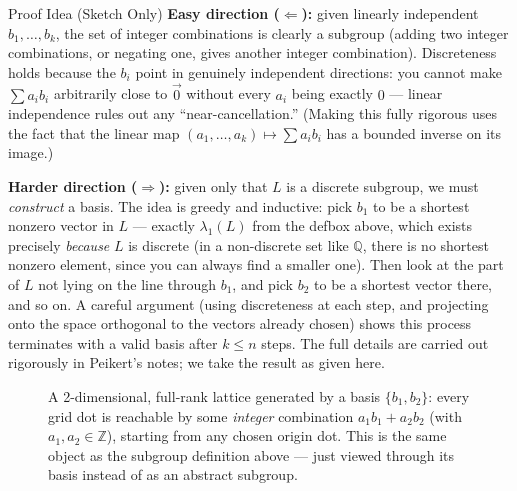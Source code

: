 \begin{rmkbox}{Proof Idea (Sketch Only)}
\textbf{Easy direction ($\Leftarrow$):} given linearly independent $b_1,\ldots,b_k$, the set of integer combinations is clearly a subgroup (adding two integer combinations, or negating one, gives another integer combination). Discreteness holds because the $b_i$ point in genuinely independent directions: you cannot make $\sum a_i b_i$ arbitrarily close to $\vec 0$ without every $a_i$ being exactly $0$ --- linear independence rules out any ``near-cancellation.'' (Making this fully rigorous uses the fact that the linear map $(a_1,\ldots,a_k) \mapsto \sum a_i b_i$ has a bounded inverse on its image.)

\textbf{Harder direction ($\Rightarrow$):} given only that $L$ is a discrete subgroup, we must \emph{construct} a basis. The idea is greedy and inductive: pick $b_1$ to be a shortest nonzero vector in $L$ --- exactly $\lambda_1(L)$ from the defbox above, which exists precisely \emph{because} $L$ is discrete (in a non-discrete set like $\mathbb{Q}$, there is no shortest nonzero element, since you can always find a smaller one). Then look at the part of $L$ not lying on the line through $b_1$, and pick $b_2$ to be a shortest vector there, and so on. A careful argument (using discreteness at each step, and projecting onto the space orthogonal to the vectors already chosen) shows this process terminates with a valid basis after $k \le n$ steps. The full details are carried out rigorously in Peikert's notes; we take the result as given here.
\end{rmkbox}

\begin{figure}[h]
\centering
{}
\caption{A 2-dimensional, full-rank lattice generated by a basis $\{b_1, b_2\}$: every grid dot is reachable by some \emph{integer} combination $a_1 b_1 + a_2 b_2$ (with $a_1, a_2 \in \mathbb{Z}$), starting from any chosen origin dot. This is the same object as the subgroup definition above --- just viewed through its basis instead of as an abstract subgroup.}
\label{fig:latticegrid}
\end{figure}

